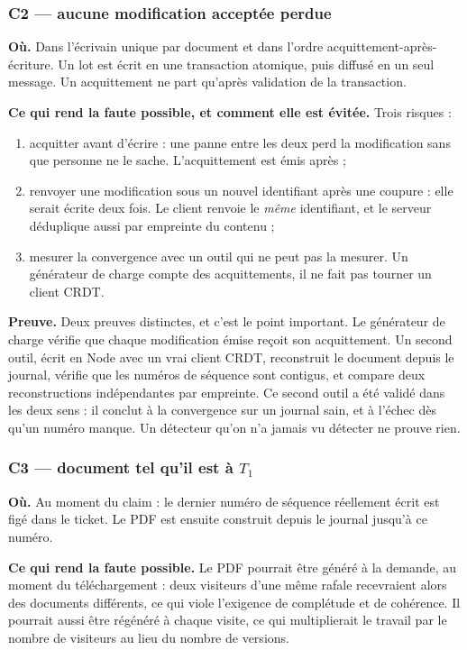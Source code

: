 \subsubsection{C2 — aucune modification acceptée perdue}

\textbf{Où.} Dans l'écrivain unique par document et dans l'ordre
acquittement-après-écriture. Un lot est écrit en une transaction atomique, puis
diffusé en un seul message. Un acquittement ne part qu'après validation de la
transaction.

\textbf{Ce qui rend la faute possible, et comment elle est évitée.} Trois
risques :

\begin{enumerate}[leftmargin=1.4em,itemsep=2pt]
  \item acquitter avant d'écrire : une panne entre les deux perd la modification
        sans que personne ne le sache. L'acquittement est émis après ;
  \item renvoyer une modification sous un nouvel identifiant après une coupure :
        elle serait écrite deux fois. Le client renvoie le \emph{même}
        identifiant, et le serveur déduplique aussi par empreinte du contenu ;
  \item mesurer la convergence avec un outil qui ne peut pas la mesurer. Un
        générateur de charge compte des acquittements, il ne fait pas tourner un
        client CRDT.
\end{enumerate}

\textbf{Preuve.} Deux preuves distinctes, et c'est le point important. Le
générateur de charge vérifie que chaque modification émise reçoit son
acquittement. Un second outil, écrit en Node avec un vrai client CRDT,
reconstruit le document depuis le journal, vérifie que les numéros de séquence
sont contigus, et compare deux reconstructions indépendantes par empreinte. Ce
second outil a été validé dans les deux sens : il conclut à la convergence sur un
journal sain, et à l'échec dès qu'un numéro manque. Un détecteur qu'on n'a jamais
vu détecter ne prouve rien.

\subsubsection{C3 — document tel qu'il est à $T_1$}

\textbf{Où.} Au moment du claim : le dernier numéro de séquence réellement écrit
est figé dans le ticket. Le PDF est ensuite construit depuis le journal jusqu'à
ce numéro.

\textbf{Ce qui rend la faute possible.} Le PDF pourrait être généré à la demande,
au moment du téléchargement : deux visiteurs d'une même rafale recevraient alors
des documents différents, ce qui viole l'exigence de complétude et de cohérence.
Il pourrait aussi être régénéré à chaque visite, ce qui multiplierait le travail
par le nombre de visiteurs au lieu du nombre de versions.

